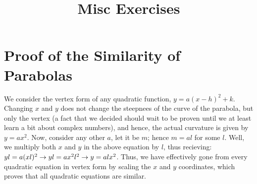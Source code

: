 \documentclass{article}
\title{Misc Exercises}
\theoremstyle{definition}
\begin{document}
\maketitle

\section*{Proof of the Similarity of Parabolas}
We consider the vertex form of any quadratic function, $y=a(x-h)^2+k$. Changing $x$ and $y$ does not change the steepnees of the curve of the parabola, but only the 
vertex (a fact that we decided should wait to be proven until we at least learn a bit about complex numbers), and hence, the actual curvature is given by $y=ax^2$. Now, 
consider any other $a$, let it be $m$; hence $m=al$ for some $l$. Well, we multiply both $x$ and $y$ in the above equation by $l$, thus recieving:\newline
$yl=a(xl)^2\newline\rightarrow yl=ax^2l^2\newline\rightarrow y=alx^2$. Thus, we have effectively gone from every quadratic equation in vertex form by scaling the 
$x$ and $y$ coordinates, which proves that all quadratic equations are similar.
\end{document}
